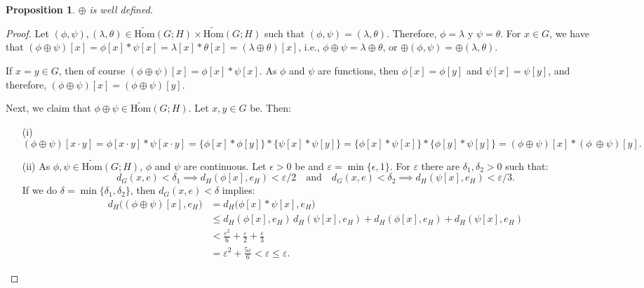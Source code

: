 \documentclass{article}
\newtheorem{proposition}[theorem]{Proposition}
\numberwithin{theorem}{section}
\numberwithin{equation}{section}
\begin{document}
\begin{proposition}\label{prop1}
$\oplus$ is well defined.
\end{proposition}
\begin{proof}
Let $(\phi, \psi), (\lambda, \theta) \in \tilde{\mathrm{Hom}}(G; H) \times \tilde{\mathrm{Hom}}(G; H)$ such that $(\phi, \psi) = (\lambda, \theta)$. Therefore, $\phi = \lambda$ y $\psi = \theta$. For $x \in G$, we have that $(\phi \oplus \psi)[x] = \phi[x] \ast \psi[x] = \lambda[x] \ast \theta[x] = (\lambda \oplus \theta)[x]$, i.e., $\phi \oplus \psi = \lambda \oplus \theta$, or $\oplus(\phi, \psi) = \oplus(\lambda, \theta)$. 

If $x = y \in G$, then of course $(\phi \oplus \psi)[x] = \phi[x] \ast \psi[x]$. As $\phi$ and $\psi$ are functions, then $\phi[x] = \phi[y]$ and $\psi[x] = \psi[y]$, and therefore, $(\phi \oplus \psi)[x] = (\phi \oplus \psi)[y]$.

Next, we claim that $\phi \oplus \psi \in \tilde{\mathrm{Hom}}(G; H)$. Let $x, y \in G$ be. Then:
\begin{enumerate}
\item[(i)]
\[
(\phi \oplus \psi)[x \cdot y] = \phi[x \cdot y] \ast \psi[x \cdot y] = \{\phi[x] \ast \phi[y]\} \ast \{\psi[x] \ast \psi[y]\} = \{\phi[x] \ast \psi[x]\} \ast \{\phi[y] \ast \psi[y]\} = (\phi \oplus \psi)[x] \ast (\phi \
\oplus \psi)[y].
\]
\item[(ii)]
As $\phi, \psi \in \tilde{\mathrm{Hom}}(G; H)$, $\phi$ and $\psi$ are continuous. Let $\epsilon > 0$ be and $\varepsilon = \min\{\epsilon, 1\}$. For $\varepsilon$ there are $\delta_1, \delta_2 > 0$ such that:
\[
d_G(x, e) < \delta_1 \implies d_H(\phi[x], e_H) < \varepsilon/2 \quad \text{and} \quad d_G(x, e) < \delta_2 \implies d_H(\psi[x], e_H) < \varepsilon/3.
\]
If we do $\delta = \min\{\delta_1, \delta_2\}$, then $d_G(x, e) < \delta$ implies:
\begin{align*}
d_H\bigl((\phi \oplus \psi)[x], e_H\bigr)
&= d_H\bigl(\phi[x] \ast \psi[x], e_H\bigr) \\
&\le d_H(\phi[x], e_H)\, d_H(\psi[x], e_H)
   + d_H(\phi[x], e_H)
   + d_H(\psi[x], e_H) \\
&< \frac{\varepsilon^2}{6}
   + \frac{\varepsilon}{2}
   + \frac{\varepsilon}{3} \\
&= \varepsilon^2 + \frac{5\varepsilon}{6}
 < \varepsilon \le \varepsilon.
\end{align*}

\end{enumerate}
\end{proof}
\end{document}
